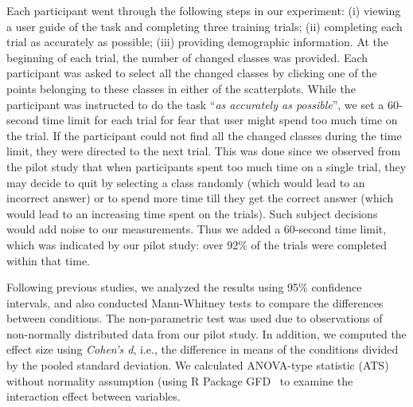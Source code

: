 {\vspace{.3em}
Each participant went through the following steps in our experiment: (i) viewing a user guide of the task and completing three training trials; (ii) completing each trial as accurately as possible; (iii) providing demographic information. At the beginning of each trial, the number of changed classes was provided. Each participant was asked to select all the changed classes by clicking one of the points belonging to these classes in either of the scatterplots. While the participant was instructed to do the task ``\emph{as accurately as possible}'', we set a $60$-second time limit for each trial for fear that user might spend too much time on the trial. If the participant could not find all the changed classes during the time limit, they were directed to the next trial. %
This was done since we observed from the pilot study that when participants spent too much time on a single trial, they may decide to quit by selecting a class randomly (which would lead to an incorrect answer) or to spend more time till they get the correct answer
(which would lead to an increasing time spent on the trials). Such subject decisions would add noise to our measurements. Thus we added a $60$-second time limit, which was indicated by our pilot study: over $92\%$ of the trials were completed within that time.

{}
Following previous studies, we analyzed the results using 95\% confidence intervals, and also conducted Mann-Whitney tests to compare the differences between conditions. The non-parametric test was used due to observations of non-normally distributed data from our pilot study. In addition, we computed the effect size using \emph{Cohen's d}, i.e., the difference in means of the conditions divided by the pooled standard deviation. We calculated ANOVA-type statistic (ATS) without normality assumption (using R Package GFD~\cite{gfd2017} to examine the interaction effect between variables.


}
